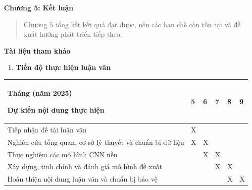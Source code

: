 \documentclass[
]{article}
\newcounter{none} %
\begin{document}
\textbf{Chương 5: Kết luận}

\begin{quote}
Chương 5 tổng kết kết quả đạt được, nêu các hạn chế còn tồn tại và đề
xuất hướng phát triển tiếp theo.
\end{quote}

\textbf{Tài liệu tham khảo}

\begin{enumerate}
\def\labelenumi{\arabic{enumi}.}
\setcounter{enumi}{6}
\item
  \protect{}\label{_Toc232111994}{}\textbf{Tiến độ thực hiện
  luận văn}
\end{enumerate}

{\def\LTcaptype{none} %
\begin{longtable}[]{@{}
  >{\raggedright\arraybackslash}p{}
  >{\raggedright\arraybackslash}p{}
  >{\raggedright\arraybackslash}p{}
  >{\raggedright\arraybackslash}p{}
  >{\raggedright\arraybackslash}p{}
  >{\raggedright\arraybackslash}p{}@{}}
\toprule\noalign{}
\begin{minipage}[b]{\linewidth}\raggedright
Tháng (năm 2025)

Dự kiến nội dung thực hiện
\end{minipage} & \begin{minipage}[b]{\linewidth}\raggedright
5
\end{minipage} & \begin{minipage}[b]{\linewidth}\raggedright
6
\end{minipage} & \begin{minipage}[b]{\linewidth}\raggedright
7
\end{minipage} & \begin{minipage}[b]{\linewidth}\raggedright
8
\end{minipage} & \begin{minipage}[b]{\linewidth}\raggedright
9
\end{minipage} \\
\midrule\noalign{}
\endhead
\bottomrule\noalign{}
\endlastfoot
Tiếp nhận đề tài luận văn & X & & & & \\
Nghiên cứu tổng quan, cơ sở lý thuyết và chuẩn bị dữ liệu & X & X & & & \\
Thực nghiệm các mô hình CNN nền & & X & X & & \\
Xây dựng, tinh chỉnh và đánh giá mô hình đề xuất & & & X & X & \\
Hoàn thiện nội dung luận văn và chuẩn bị bảo vệ & & & & X & X \\
\end{longtable}
}
\end{document}
